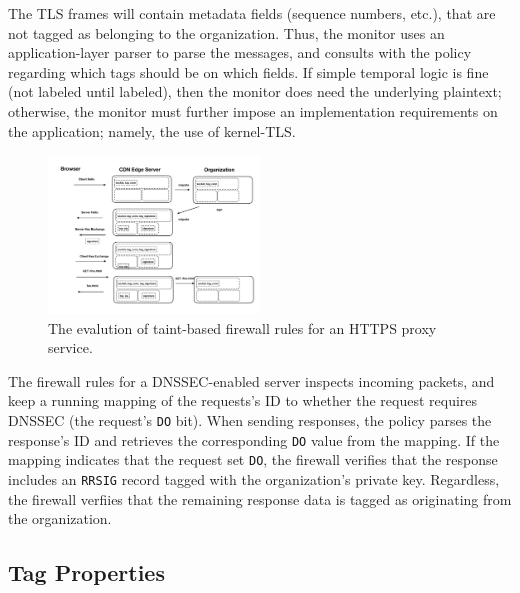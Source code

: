 The TLS frames will contain metadata fields (sequence numbers, etc.),
that are not tagged as belonging to the organization.
%
Thus, the monitor uses an application-layer parser to parse the
messages, and consults with the policy regarding which tags should be on
which fields.
%
If simple temporal logic is fine (not labeled until labeled), then the monitor
does need the underlying plaintext; otherwise, the monitor must further impose
an implementation requirements on the application; namely, the use of
kernel-TLS\@.


\begin{figure}[t]
	\centering
    \includegraphics[width=0.5\textwidth]{figs/https-flowchart}
    \caption{The evalution of taint-based firewall rules for an HTTPS proxy
    service.}
	\label{fig:https-flowchart}
\end{figure}


%
The firewall rules for a DNSSEC-enabled server inspects incoming packets, and keep a
running mapping of the requests's ID to whether the request requires DNSSEC
(the request's \texttt{DO} bit).
%
When sending responses, the policy  parses the response's ID and retrieves the
corresponding \texttt{DO} value from the mapping.
%
If the mapping indicates that the request set \texttt{DO}, the firewall
verifies that the response includes an \texttt{RRSIG} record tagged with the
organization's private key.
%
Regardless, the firewall verfiies that the remaining response data is tagged as originating
from the organization.


\subsection{Tag Properties}

